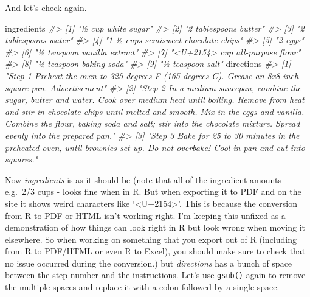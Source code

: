 \documentclass[
  12pt,
  openany]{book}
\newenvironment{Shaded}{\begin{snugshade}}{\end{snugshade}}
\newcommand{\CommentTok}[1]{\textcolor[rgb]{0.37,0.37,0.37}{\textit{#1}}}
\newcommand{\NormalTok}[1]{#1}
\begin{document}
And let's check again.

\begin{Shaded}
\begin{Highlighting}[]
\NormalTok{ingredients}
\CommentTok{\#\textgreater{} [1] "½ cup white sugar"                 }
\CommentTok{\#\textgreater{} [2] "2 tablespoons butter"              }
\CommentTok{\#\textgreater{} [3] "2 tablespoons water"               }
\CommentTok{\#\textgreater{} [4] "1 ½ cups semisweet chocolate chips"}
\CommentTok{\#\textgreater{} [5] "2 eggs"                            }
\CommentTok{\#\textgreater{} [6] "½ teaspoon vanilla extract"        }
\CommentTok{\#\textgreater{} [7] "\textless{}U+2154\textgreater{} cup all{-}purpose flour"    }
\CommentTok{\#\textgreater{} [8] "¼ teaspoon baking soda"            }
\CommentTok{\#\textgreater{} [9] "½ teaspoon salt"}
\NormalTok{directions}
\CommentTok{\#\textgreater{} [1] "Step 1   Preheat the oven to 325 degrees F (165 degrees C). Grease an 8x8 inch square pan.    Advertisement"                                                                                                                                                                                                               }
\CommentTok{\#\textgreater{} [2] "Step 2   In a medium saucepan, combine the sugar, butter and water. Cook over medium heat until boiling. Remove from heat and stir in chocolate chips until melted and smooth. Mix in the eggs and vanilla. Combine the flour, baking soda and salt; stir into the chocolate mixture. Spread evenly into the prepared pan."}
\CommentTok{\#\textgreater{} [3] "Step 3   Bake for 25 to 30 minutes in the preheated oven, until brownies set up. Do not overbake! Cool in pan and cut into squares."}
\end{Highlighting}
\end{Shaded}

Now \emph{ingredients} is as it should be (note that all of the ingredient amounts - e.g.~2/3 cups - looks fine when in R. But when exporting it to PDF and on the site it shows weird characters like `\textless U+2154\textgreater{}'. This is because the conversion from R to PDF or HTML isn't working right. I'm keeping this unfixed as a demonstration of how things can look right in R but look wrong when moving it elsewhere. So when working on something that you export out of R (including from R to PDF/HTML or even R to Excel), you should make sure to check that no issue occurred during the conversion.) but \emph{directions} has a bunch of space between the step number and the instructions. Let's use \texttt{gsub()} again to remove the multiple spaces and replace it with a colon followed by a single space.
\end{document}
